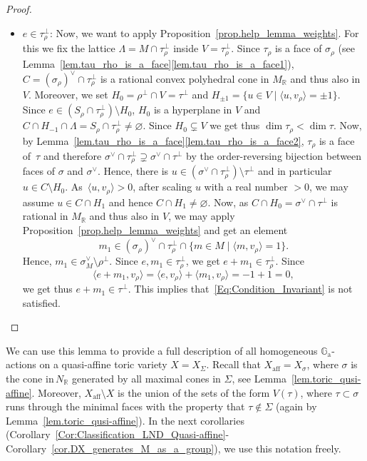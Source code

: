 \documentclass[JEP,XML,SOM,Unicode]{cedram}
\newcommand{\ra}{\mathrm{a}}
\let\oldvee\vee
\renewcommand{\vee}{{\scriptscriptstyle\oldvee}}
\let\oldbot\bot
\renewcommand{\bot}{{\scriptscriptstyle\oldbot}}
\theoremstyle{plain}
\theoremstyle{definition}
\DeclareMathOperator{\aff}{aff}
\newcommand{\GG}{\mathbb{G}}
\newcommand{\RR}{\mathbb{R}}
\newcommand{\set}[2]{\{#1 \mid #2\}}
\newcommand{\sprod}[2]{\langle #1, #2 \rangle}
\begin{document}
\begin{proof}
\begin{enumerate}
\begin{itemize}
\item $e \in \tau_\rho^\bot$:
Now, we want to apply Proposition~\ref{prop.help_lemma_weights}.
For this we fix the lattice $\Lambda = M \cap \tau_{\rho}^\bot$ inside
$V = \tau_{\rho}^\bot$.
Since $\tau_\rho$ is a face of $\sigma_\rho$ (see Lemma~\ref{lem.tau_rho_is_a_face}\eqref{lem.tau_rho_is_a_face1}),
$C =(\sigma_\rho)^\vee \cap \tau_{\rho}^\bot$ is a rational convex polyhedral cone
in $M_\RR$ and thus also in $V$.
Moreover, we set $H_0 = \rho^\bot \cap V = \tau^\bot$
and $H_{\pm1} = \set{u \in V}{\sprod{u}{v_{\rho}} = \pm 1}$.
Since $e \in (S_\rho \cap \tau_\rho^\bot) \setminus H_0$, $H_0$ is a hyperplane in $V$ and
$C \cap H_{-1} \cap \Lambda = S_{\rho} \cap \tau_{\rho}^\bot \neq \varnothing$.
Since $H_0 \subsetneq V$ we get thus $\dim \tau_\rho < \dim \tau$.
Now, by Lemma~\ref{lem.tau_rho_is_a_face}\eqref{lem.tau_rho_is_a_face2},
$\tau_\rho$ is a face of~$\tau$ and therefore
$\sigma^\vee \cap \tau_\rho^\bot \supsetneq \sigma^\vee \cap \tau^\bot$
by the order-reversing bijection between faces of $\sigma$ and
$\sigma^\vee$. Hence,
there is $u \in (\sigma^\vee \cap \tau_\rho^\bot) \setminus \tau^\bot$ and in particular
$u \in C \setminus H_0$. As~$\sprod{u}{v_{\rho}} > 0$, after scaling $u$
with a real number $>0$, we may assume
$u \in C \cap H_1$ and hence $C \cap H_1 \neq \varnothing$.
Now, as $C \cap H_0 = \sigma^\vee \cap \tau^{\bot}$ is rational
in $M_{\RR}$ and thus also in $V$,
we may apply Proposition~\ref{prop.help_lemma_weights} and get an element
\[
m_1 \in (\sigma_\rho)^\vee \cap \tau_{\rho}^\bot \cap \set{m \in M}{\sprod{m}{v_{\rho}}=1}.
\]
Hence, $m_1 \in \sigma_M^\vee \setminus \rho^\bot$.
Since $e, m_1 \in \tau_{\rho}^\bot$, we get
$e + m_1 \in \tau_{\rho}^\bot$. Since
\[
\sprod{e + m_1}{v_{\rho}} = \sprod{e}{v_{\rho}} + \sprod{m_1}{v_{\rho}} = -1 + 1 = 0,
\]
we get thus $e + m_1 \in \tau^\bot$. This implies
that~\eqref{Eq:Condition_Invariant} is not satisfied.\qedhere
\end{itemize}
\end{enumerate}
\end{proof}

We can use this lemma to provide a full description of all homogeneous $\GG_\ra$-actions on a quasi-affine toric variety $X = X_\Sigma$.
Recall that $X_{\aff} = X_\sigma$, where $\sigma$ is the
cone in\,$N_{\RR}$ generated by all maximal cones in $\Sigma$, see
Lemma~\ref{lem.toric_qusi-affine}. Moreover, $X_{\aff} \setminus X$ is the union of the
sets of the form $V(\tau)$, where $\tau \subset \sigma$ runs through the minimal faces with
the property that $\tau \not\in \Sigma$ (again by Lemma~\ref{lem.toric_qusi-affine}).
In the next corollaries (Corollary~\ref{Cor:Classification_LND_Quasi-affine}- Corollary~\ref{cor.DX_generates_M_as_a_group}),
we use this notation freely.
\end{document}
